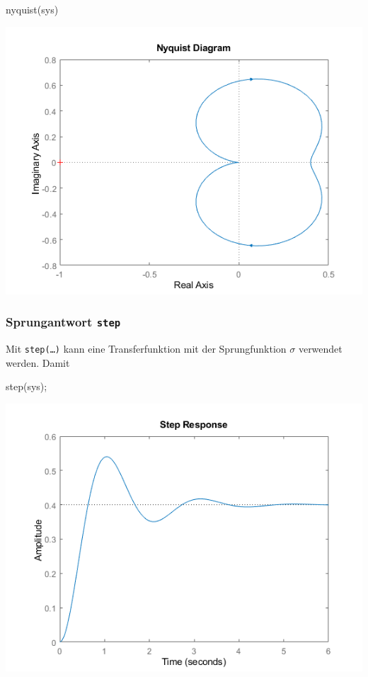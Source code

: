 \documentclass[
  10pt,
  a4paper,
  german]{article}
\newenvironment{Shaded}{}{}
\newcommand{\NormalTok}[1]{\textcolor[rgb]{0.14,0.16,0.18}{#1}}
\newcommand{\OperatorTok}[1]{\textcolor[rgb]{0.14,0.16,0.18}{#1}}
\newcommand{\VariableTok}[1]{\textcolor[rgb]{0.89,0.38,0.04}{#1}}
\numberwithin{equation}{section}
\begin{document}
\begin{multicols}{2}
\begin{Shaded}
\begin{Highlighting}[]
\VariableTok{nyquist}\NormalTok{(}\VariableTok{sys}\NormalTok{)}
\end{Highlighting}
\end{Shaded}

\includegraphics{images/matlab_NyquistPlotResponse.png.png}

\hypertarget{sprungantwort-step}{%
\subsubsection{\texorpdfstring{Sprungantwort
\texttt{step}}{Sprungantwort step}}\label{sprungantwort-step}}

Mit \texttt{step(…)} kann eine Transferfunktion mit der Sprungfunktion
\(\sigma\) verwendet werden. Damit

\begin{Shaded}
\begin{Highlighting}[]
\VariableTok{step}\NormalTok{(}\VariableTok{sys}\NormalTok{)}\OperatorTok{;}
\end{Highlighting}
\end{Shaded}

\includegraphics{images/matlab_StepResponsePlot.png}


\end{multicols}
\end{document}
